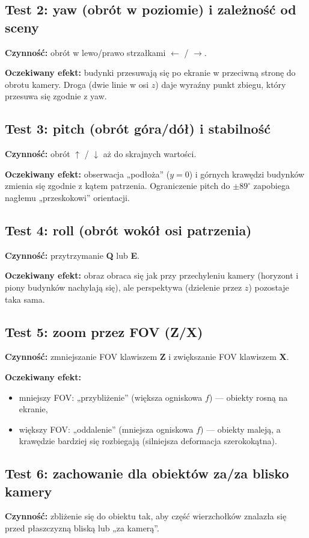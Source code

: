 \documentclass[12pt,a4paper]{article}
\begin{document}
\subsection{Test 2: yaw (obrót w poziomie) i zależność od sceny}
\textbf{Czynność:} obrót w lewo/prawo strzałkami $\leftarrow$ / $\rightarrow$.

\textbf{Oczekiwany efekt:} budynki przesuwają się po ekranie w przeciwną stronę do obrotu kamery.
Droga (dwie linie w osi $z$) daje wyraźny punkt zbiegu, który przesuwa się zgodnie z yaw.

\subsection{Test 3: pitch (obrót góra/dół) i stabilność}
\textbf{Czynność:} obrót $\uparrow$ / $\downarrow$ aż do skrajnych wartości.

\textbf{Oczekiwany efekt:} obserwacja „podłoża” ($y=0$) i górnych krawędzi budynków zmienia się zgodnie z kątem patrzenia.
Ograniczenie pitch do $\pm 89^\circ$ zapobiega nagłemu „przeskokowi” orientacji.

\subsection{Test 4: roll (obrót wokół osi patrzenia)}
\textbf{Czynność:} przytrzymanie \textbf{Q} lub \textbf{E}.

\textbf{Oczekiwany efekt:} obraz obraca się jak przy przechyleniu kamery (horyzont i piony budynków nachylają się), ale perspektywa (dzielenie przez $z$) pozostaje taka sama.

\subsection{Test 5: zoom przez FOV (Z/X)}
\textbf{Czynność:} zmniejszanie FOV klawiszem \textbf{Z} i zwiększanie FOV klawiszem \textbf{X}.

\textbf{Oczekiwany efekt:}
\begin{itemize}
    \item mniejszy FOV: „przybliżenie” (większa ogniskowa $f$) — obiekty rosną na ekranie,
    \item większy FOV: „oddalenie” (mniejsza ogniskowa $f$) — obiekty maleją, a krawędzie bardziej się rozbiegają (silniejsza deformacja szerokokątna).
\end{itemize}

\subsection{Test 6: zachowanie dla obiektów za/za blisko kamery}
\textbf{Czynność:} zbliżenie się do obiektu tak, aby część wierzchołków znalazła się przed płaszczyzną bliską lub „za kamerą”.
\end{document}
